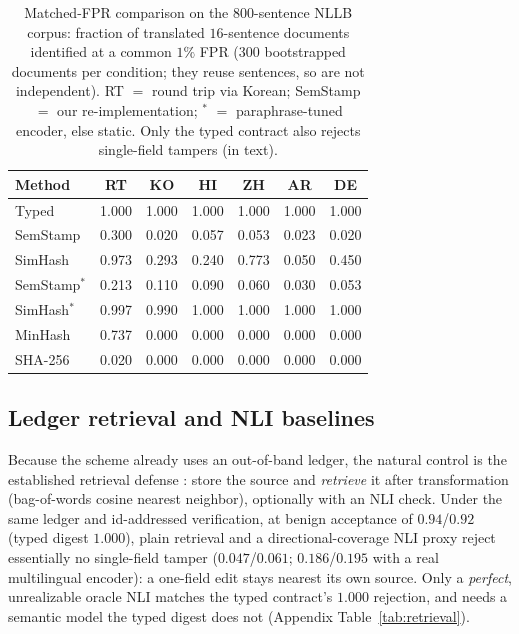 \documentclass[11pt]{article}
\begin{document}
\begin{table}[t]
\centering
\caption{Matched-FPR comparison on the 800-sentence NLLB corpus: fraction of
translated $16$-sentence documents identified at a common $1\%$ FPR ($300$
bootstrapped documents per condition; they reuse sentences, so are not
independent). RT $=$ round trip via Korean; SemStamp $=$ our re-implementation;
$^\ast$ $=$ paraphrase-tuned encoder, else static. Only the typed contract also
rejects single-field tampers (in text).}
\label{tab:matched}
\footnotesize
\setlength{\tabcolsep}{3pt}
\begin{tabular*}{\linewidth}{@{}l@{\extracolsep{\fill}}cccccc@{}}
\toprule
Method & RT & KO & HI & ZH & AR & DE \\
\midrule
Typed          & 1.000 & 1.000 & 1.000 & 1.000 & 1.000 & 1.000 \\
SemStamp       & 0.300 & 0.020 & 0.057 & 0.053 & 0.023 & 0.020 \\
SimHash        & 0.973 & 0.293 & 0.240 & 0.773 & 0.050 & 0.450 \\
SemStamp$^\ast$ & 0.213 & 0.110 & 0.090 & 0.060 & 0.030 & 0.053 \\
SimHash$^\ast$  & 0.997 & 0.990 & 1.000 & 1.000 & 1.000 & 1.000 \\
MinHash        & 0.737 & 0.000 & 0.000 & 0.000 & 0.000 & 0.000 \\
SHA-256        & 0.020 & 0.000 & 0.000 & 0.000 & 0.000 & 0.000 \\
\bottomrule
\end{tabular*}
\end{table}

\subsection{Ledger retrieval and NLI baselines}
\label{sec:retrieval}
Because the scheme already uses an out-of-band ledger, the natural control is the established retrieval defense \cite{krishna2023retrieval}: store the source and \emph{retrieve} it after transformation (bag-of-words cosine nearest neighbor), optionally with an NLI check. Under the same ledger and id-addressed verification, at benign acceptance of $0.94$/$0.92$ (typed digest $1.000$), plain retrieval and a directional-coverage NLI proxy reject essentially no single-field tamper ($0.047$/$0.061$; $0.186$/$0.195$ with a real multilingual encoder): a one-field edit stays nearest its own source. Only a \emph{perfect}, unrealizable oracle NLI matches the typed contract's $1.000$ rejection, and needs a semantic model the typed digest does not (Appendix Table~\ref{tab:retrieval}).
\end{document}
